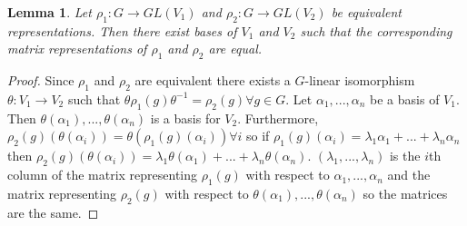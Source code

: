 \documentclass{article}
\newtheorem{lemma}[theorem]{Lemma}
\begin{document}
\begin{lemma}
Let $\rho_1:G\to GL(V_1)$ and $\rho_2:G\to GL(V_2)$ be equivalent representations. Then there exist bases of $V_1$ and $V_2$ such that the corresponding matrix representations of $\rho_1$ and $\rho_2$ are equal.
\end{lemma}
\begin{proof}
Since $\rho_1$ and $\rho_2$ are equivalent there exists a $G$-linear isomorphism $\theta:V_1\to V_2$ such that $\theta\rho_1(g)\theta^{-1}=\rho_2(g)\forall g\in G$. Let $\alpha_1,...,\alpha_n$ be a basis of $V_1$. Then $\theta(\alpha_1),...,\theta(\alpha_n)$ is a basis for $V_2$. Furthermore, $\rho_2(g)(\theta(\alpha_i))=\theta(\rho_1(g)(\alpha_i))\forall i$ so if $\rho_1(g)(\alpha_i)=\lambda_1\alpha_1+...+\lambda_n\alpha_n$ then $\rho_2(g)(\theta(\alpha_i))=\lambda_1\theta(\alpha_1)+...+\lambda_n\theta(\alpha_n)$. $(\lambda_1,...,\lambda_n)$ is the $i$th column of the matrix representing $\rho_1(g)$ with respect to $\alpha_1,...,\alpha_n$ and the matrix representing $\rho_2(g)$ with respect to $\theta(\alpha_1),...,\theta(\alpha_n)$ so the matrices are the same.
\end{proof}
\end{document}
